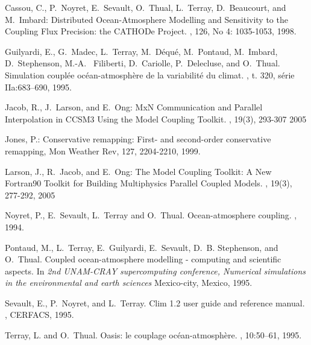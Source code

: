 \newpage
\begin{thebibliography}{10}

Cassou, C., P.~Noyret, E.~Sevault, O.~Thual, L.~Terray, D.~Beaucourt, and
  M.~Imbard:
\newblock Distributed Ocean-Atmosphere Modelling and Sensitivity to the
  Coupling Flux Precision: the CATHODe Project.
, 126, No 4: 1035-1053, 1998.

Guilyardi, E., G.~Madec, L.~Terray, M.~D\'equ\'e, M.~Pontaud, M.~Imbard, D.~Stephenson, M.-A. ~Filiberti, D.~Cariolle, P.~Delecluse, and O.~Thual. 
\newblock Simulation coupl\'ee oc\'ean-atmosph\`ere de la variabilit\'e du climat.
, t. 320, s\'erie IIa:683--690, 1995. 

Jacob, R., J.~Larson, and E.~Ong:
\newblock MxN Communication and Parallel Interpolation in CCSM3 Using the Model Coupling Toolkit.
, 19(3), 293-307 2005

Jones, P.: Conservative remapping: First- and second-order conservative
  remapping, Mon Weather Rev, 127, 2204-2210, 1999. 

Larson, J., R.~Jacob, and E.~Ong:
\newblock The Model Coupling Toolkit: A New Fortran90 Toolkit for Building Multiphysics Parallel Coupled Models.
, 19(3), 277-292, 2005

Noyret, P., E.~Sevault, L.~Terray and O.~Thual.
\newblock Ocean-atmosphere coupling. 
,
1994.

Pontaud, M., L.~Terray, E.~Guilyardi, E.~Sevault, D.~B. Stephenson, and
  O.~Thual.
\newblock Coupled ocean-atmosphere modelling - computing and scientific
  aspects.
\newblock In {\em 2nd UNAM-CRAY supercomputing conference, Numerical
  simulations in the environmental and earth sciences}
\newblock Mexico-city, Mexico, 1995.

Sevault, E., P.~Noyret, and L.~Terray.
\newblock Clim 1.2 user guide and reference manual.
, CERFACS, 1995.

Terray, L. and O.~Thual.
\newblock Oasis: le couplage oc\'ean-atmosph\`ere.
, 10:50--61, 1995.


\end{thebibliography}
